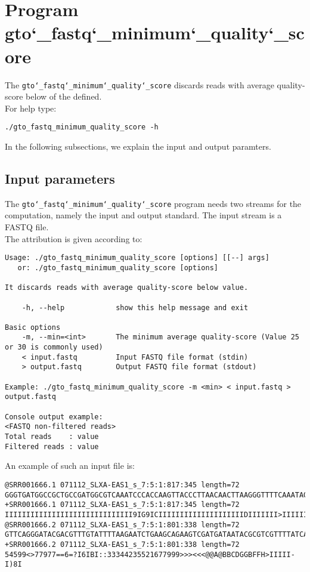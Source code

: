 \section{Program gto\char`_fastq\char`_minimum\char`_quality\char`_score}
The \texttt{gto\char`_fastq\char`_minimum\char`_quality\char`_score} discards reads with average quality-score below of the defined.\\
For help type:
\begin{lstlisting}
./gto_fastq_minimum_quality_score -h
\end{lstlisting}
In the following subsections, we explain the input and output paramters.

\subsection*{Input parameters}

The \texttt{gto\char`_fastq\char`_minimum\char`_quality\char`_score} program needs two streams for the computation, namely the input and output standard. The input stream is a FASTQ file.\\
The attribution is given according to:
\begin{lstlisting}
Usage: ./gto_fastq_minimum_quality_score [options] [[--] args]
   or: ./gto_fastq_minimum_quality_score [options]

It discards reads with average quality-score below value.

    -h, --help            show this help message and exit

Basic options
    -m, --min=<int>       The minimum average quality-score (Value 25 or 30 is commonly used)
    < input.fastq         Input FASTQ file format (stdin)
    > output.fastq        Output FASTQ file format (stdout)

Example: ./gto_fastq_minimum_quality_score -m <min> < input.fastq > output.fastq

Console output example:
<FASTQ non-filtered reads>
Total reads    : value
Filtered reads : value
\end{lstlisting}
An example of such an input file is:
\begin{lstlisting}
@SRR001666.1 071112_SLXA-EAS1_s_7:5:1:817:345 length=72
GGGTGATGGCCGCTGCCGATGGCGTCAAATCCCACCAAGTTACCCTTAACAACTTAAGGGTTTTCAAATAGA
+SRR001666.1 071112_SLXA-EAS1_s_7:5:1:817:345 length=72
IIIIIIIIIIIIIIIIIIIIIIIIIIIIII9IG9ICIIIIIIIIIIIIIIIIIIIIDIIIIIII>IIIIII/
@SRR001666.2 071112_SLXA-EAS1_s_7:5:1:801:338 length=72
GTTCAGGGATACGACGTTTGTATTTTAAGAATCTGAAGCAGAAGTCGATGATAATACGCGTCGTTTTATCAT
+SRR001666.2 071112_SLXA-EAS1_s_7:5:1:801:338 length=72
54599<>77977==6=?I6IBI::33344235521677999>>><<<@@A@BBCDGGBFFH>IIIII-I)8I
\end{lstlisting}

